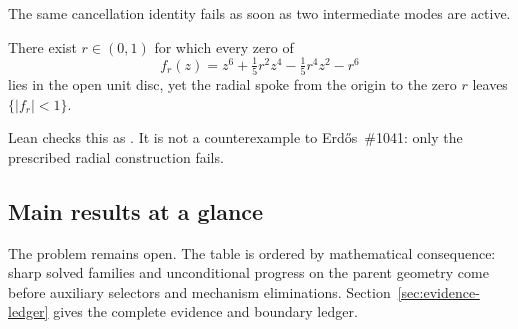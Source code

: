 The same cancellation identity fails as soon as two intermediate modes are
active.

\begin{proposition}
\label{res:sextic-spoke}
There exist $r\in(0,1)$ for which every zero of
\[
 f_r(z)=z^6+\tfrac15 r^2 z^4-\tfrac15 r^4 z^2-r^6
\]
lies in the open unit disc, yet the radial spoke from the origin to the zero
$r$ leaves $\{|f_r|<1\}$.
\end{proposition}

\noindent Lean checks this as .  It is not a
counterexample to Erd\H{o}s~\#1041: only the prescribed radial construction
fails.

\subsection*{Main results at a glance}

The problem remains open.  The table is ordered by mathematical consequence:
sharp solved families and unconditional progress on the parent geometry come
before auxiliary selectors and mechanism eliminations.
Section~\ref{sec:evidence-ledger} gives the complete evidence and boundary
ledger.

